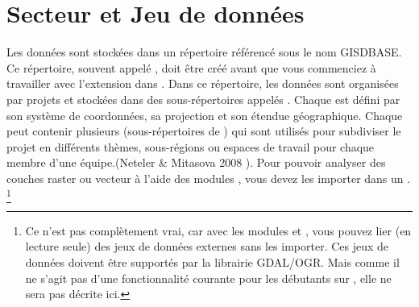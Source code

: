 \section{Secteur et Jeu de données \grass}\label{sec:about_loc}

Les données \grass sont stockées dans un répertoire référencé sous le nom GISDBASE. Ce répertoire, souvent appelé , doit être créé avant que vous commenciez à travailler avec l'extension \grass dans \qg. Dans ce répertoire, les données \grass sont organisées par projets et stockées dans des sous-répertoires appelés . Chaque  est défini par son système de coordonnées, sa projection et son étendue géographique. Chaque  peut contenir plusieurs  (sous-répertoires de ) qui sont utilisés pour subdiviser le projet en différents thèmes, sous-régions ou espaces de travail pour chaque membre d'une équipe.(Neteler \& Mitasova 2008 \cite{neteler_mitasova08}). Pour pouvoir analyser des couches raster ou vecteur à l'aide des modules \grass, vous devez les importer dans un . \footnote {Ce n'est pas complètement vrai, car avec les modules \grass {} et , vous pouvez lier (en lecture seule) des jeux de données externes sans les importer. Ces jeux de données doivent être supportés par la librairie GDAL/OGR. Mais comme il ne s'agit pas d'une fonctionnalité courante pour les débutants sur \grass, elle ne sera pas décrite ici.}

